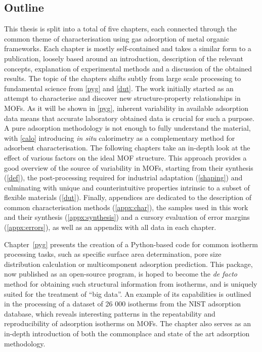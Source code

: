 \subsection*{Outline}

This thesis is split into a total of five chapters, each
connected through the common theme of characterisation 
using gas adsorption of metal organic frameworks. 
Each chapter is mostly 
self-contained and takes a similar form to a publication,
loosely based around an introduction, description of the 
relevant concepts, explanation of experimental methods and
a discussion of the obtained results. 
The topic of the chapters 
shifts subtly from large scale processing to fundamental
science from \autoref{pyg} and \autoref{dut}.
The work initially started as an attempt to characterise and
discover new structure-property relationships in \glspl{MOF}.
As it will be shown in \autoref{pyg}, inherent variability
in available adsorption data means that accurate laboratory
obtained data is crucial for such a purpose. A pure adsorption
methodology is not enough to fully understand the material,
with \autoref{calo} introducing \textit{in situ} calorimetry
as a complementary method for adsorbent characterisation.
The following chapters take an in-depth look at the effect of 
various factors on the ideal \gls{MOF} structure.
This approach provides a good overview of the source of 
variability in \glspl{MOF}, starting from their synthesis
(\autoref{def}), the post-processing required for industrial
adaptation (\autoref{shaping}) and culminating with 
unique and counterintuitive properties intrinsic to a subset 
of flexible materials (\autoref{dut}). Finally, appendices are 
dedicated to the description of common characterisation methods
(\autoref{appx:char}), the samples used in this work and their 
synthesis (\autoref{appx:synthesis}) and a cursory evaluation of 
error margins (\autoref{appx:errors}), as well as an appendix with 
all data in each chapter.

Chapter~\ref{pyg} presents the creation of a Python-based code for
common isotherm processing tasks, such as specific surface area 
determination, pore size distribution calculation or multicomponent 
adsorption prediction. This package, now published as an 
open-source program, is hoped to become the \textit{de facto}
method for obtaining such structural information from isotherms,
and is uniquely suited for the treatment of ``big data''.
An example of its capabilities is outlined in the processing of 
a dataset of 26 000 isotherms from the \gls{NIST} adsorption database,
which reveals interesting patterns in the repeatability and reproducibility
of adsorption isotherms on \glspl{MOF}. The chapter also serves as
an in-depth introduction of both the commonplace and state of the art adsorption methodology.

